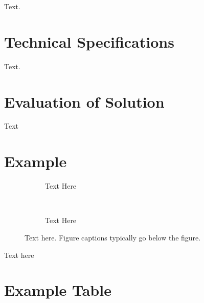 \documentclass[a4paper, 12pt, english]{article}
\begin{document}
            Text.
                



    \section{Technical Specifications}
        \label{sec: Technical Specifications}

        Text.


    \section{Evaluation of Solution}
        \label{sec: Evaluation of Solution}

        Text



    \newpage




    \newpage


    \appendices

        \section{Example}\label{app:example}
            \begin{figure}[!h]
                \begin{subfigure}[t]{0.45\textwidth}
                    \centering
                    \caption{Text Here}
                    \label{subfig: example1}
                \end{subfigure}
                ~
                \begin{subfigure}[t]{0.45\textwidth}
                    \centering
                    \caption{Text Here}
                    \label{subfig: example2}
                \end{subfigure}
                

                \caption{Text here. Figure captions typically go below the figure.}
                \label{fig: example}
            \end{figure}

            \FloatBarrier

            Text here


        \section{Example Table}
            \label{app: example table}
\end{document}
